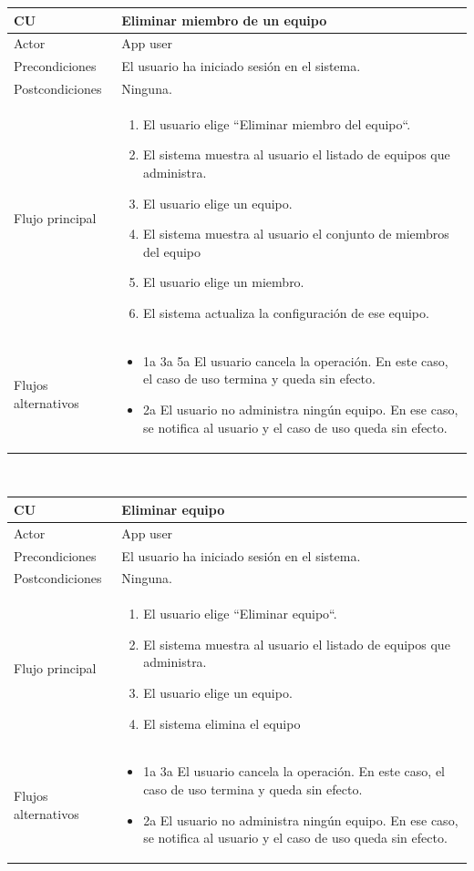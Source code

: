 \documentclass[twoside]{report}
\newcommand\addrow[2]{#1 &#2\\ }
\newcommand\addheading[2]{#1 &#2\\ \hline}
\newcommand\tabularhead{\begin{tabular}{lp{0.7\textwidth}}
\hline
}
\newenvironment{usecase}{\tabularhead}
{\hline\end{tabular}}
\begin{document}
\begin{usecase}
  \addheading{\textbf{CU\arabic{usecase}}}{Eliminar miembro de un equipo} 
  \addrow{Actor}{App user}
  \addrow{Precondiciones}{El usuario ha iniciado sesión en el sistema.}
  \addrow{Postcondiciones}{Ninguna.}
  \addrow{Flujo principal}{
  		\begin{enumerate}
  		\item El usuario elige “Eliminar miembro del equipo“. %
  		\item El sistema muestra al usuario el listado de equipos que administra. %
  		\item El usuario elige un equipo. %
  		\item El sistema muestra al usuario el conjunto de miembros del equipo %
  		\item El usuario elige un miembro. %
  		\item El sistema actualiza la configuración de ese equipo. %
  		\end{enumerate}
  }
  \addrow{Flujos alternativos}{
  		\begin{itemize}
  		\item 1a 3a 5a El usuario cancela la operación. En este caso, el caso de uso termina y queda sin efecto.
  		\item 2a El usuario no administra ningún equipo. En ese caso, se notifica al usuario y el caso de uso queda sin efecto.
  		\end{itemize}
  }
\end{usecase}\\

\vspace{0.5cm}

\begin{usecase}
  \addheading{\textbf{CU\arabic{usecase}}}{Eliminar equipo} 
  \addrow{Actor}{App user}
  \addrow{Precondiciones}{El usuario ha iniciado sesión en el sistema.}
  \addrow{Postcondiciones}{Ninguna.}
  \addrow{Flujo principal}{
  		\begin{enumerate}
  		\item El usuario elige “Eliminar equipo“. %
  		\item El sistema muestra al usuario el listado de equipos que administra. %
  		\item El usuario elige un equipo. %
  		\item El sistema elimina el equipo %
  		\end{enumerate}
  }
  \addrow{Flujos alternativos}{
  		\begin{itemize}
  		\item 1a 3a El usuario cancela la operación. En este caso, el caso de uso termina y queda sin efecto.
  		\item 2a El usuario no administra ningún equipo. En ese caso, se notifica al usuario y el caso de uso queda sin efecto.
  		\end{itemize}
  }
\end{usecase}\\
\end{document}
